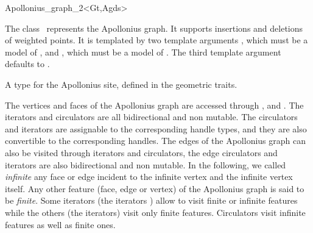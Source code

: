 

\begin{ccRefClass}{Apollonius_graph_2<Gt,Agds>}

\ccDefinition

The class \ccRefName\ represents the
Apollonius graph. It supports insertions and deletions of weighted
points. It is templated by two template arguments , which
must be a model of , and ,
which must be a model of .
The third template argument defaults to
.


\ccTypes

%
\ccGlue
{}
\ccGlue
{}
\ccGlue
{}
{A type for the Apollonius site, defined in the geometric traits.}
\ccGlue
%


The vertices and faces of the Apollonius graph are accessed
through , 
 and . 
The iterators and circulators
are all bidirectional and non mutable.
The circulators and iterators are assignable to the 
corresponding handle types, and they are also convertible to the
corresponding handles.
The edges of the Apollonius graph can also be visited through iterators
and circulators,
the edge circulators and iterators
are also bidirectional and non mutable.
In the following, we called {\it infinite} any face or edge 
incident  to the infinite vertex and the infinite vertex itself.
Any other feature (face, edge or vertex) of the Apollonius graph is said 
to be {\it finite}.
Some iterators (the  iterators ) allow to visit finite or 
infinite features while the others (the  iterators) visit only
finite features. Circulators visit infinite features as well as finite 
ones.


\end{ccRefClass}
